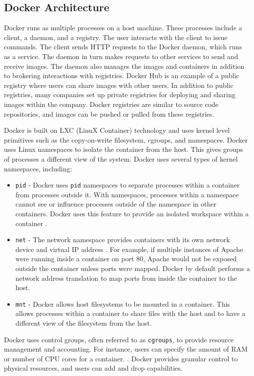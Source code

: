 \documentclass[11pt]{article}
\begin{document}
\subsection{Docker Architecture}
Docker runs as multiple processes on a host machine. These processes include a client, a daemon, and a registry. The user interacts with the client to issue commands. The client sends HTTP requests to the Docker daemon, which runs as a service. The daemon in turn makes requests to other services to send and receive images. The daemon also manages the images and containers in addition to brokering interactions with registries. Docker Hub is an example of a public registry where users can share images with other users. In addition to public registries, many companies set up private registries for deploying and sharing images within the company. Docker registries are similar to source code repositories, and images can be pushed or pulled from these registries. 

Docker is built on LXC (LinuX Container) technology \cite{merkel} and uses kernel level primitives such as the copy-on-write filesystem, cgroups, and namespaces. Docker uses Linux namespaces to isolate the container from the host. This gives groups of processes a different view of the system. Docker uses several types of kernel namespaces, including:
\begin{itemize}
	\item \texttt{pid} - Docker uses \texttt{pid} namespaces to separate processes within a container from processes outside it. With namespaces, processes within a namespace cannot see or influence processes outside of the namespace in other containers. Docker uses this feature to provide an isolated workspace within a container \cite{rosen}. 
	\item \texttt{net} - The network namespace provides containers with its own network device and virtual IP address \cite{anderson}. For example, if multiple instances of Apache were running inside a container on port 80, Apache would not be exposed outside the container unless ports were mapped. Docker by default performs a network address translation to map ports from inside the container to the host. 
	\item \texttt{mnt} - Docker allows host filesystems to be mounted in a container. This allows processes within a container to share files with the host and to have a different view of the filesystem from the host. 
\end{itemize}

Docker uses control groups, often referred to as \texttt{cgroups}, to provide resource management and accounting. For instance, users can specify the amount of RAM or number of CPU cores for a container. \cite{anderson}. Docker provides granular control to physical resources, and users can add and drop capabilities. 
\end{document}
